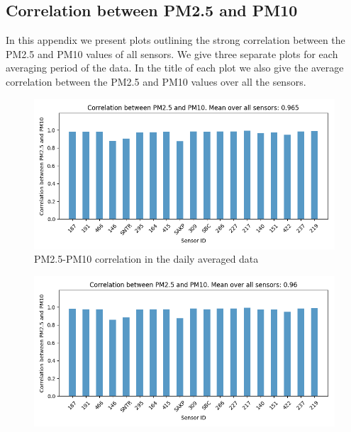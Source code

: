 \documentclass[12pt,a4paper,twoside]{scrartcl}
\numberwithin{equation}{section}
\newcounter{mypagecount}%
\newenvironment{interlude}{%
  \clearpage
  \setcounter{mypagecount}{\value{page}}%
  \thispagestyle{empty}%
  \pagestyle{empty}%
}{%
  \clearpage
  \setcounter{page}{\value{mypagecount}}%
}
\let\chapter=\section %
\begin{document}
\clearpage
\begin{interlude}
  
  \begin{appendices}
    \chapter{Correlation between PM2.5 and PM10}\label{app:a}
    In this appendix we present plots outlining the strong correlation between the PM2.5 and PM10 values of all sensors. We give three separate plots for each averaging period of the data. In the title of each plot we also give the average correlation between the PM2.5 and PM10 values over all the sensors.

    \begin{center}
      \begin{figure}[H]
        \centerline{\includegraphics[width=1\textwidth]{figures/data_files_changes/1D_P1_P2_correlation}}
        \caption[PM2.5-PM10 correlation (one day average)]{PM2.5-PM10 correlation in the daily averaged data}
      \end{figure}
      \begin{figure}[H]
        \centerline{\includegraphics[width=1\textwidth]{figures/data_files_changes/12H_P1_P2_correlation}}

\end{figure}
\end{center}
\end{appendices}
\end{interlude}
\end{document}
